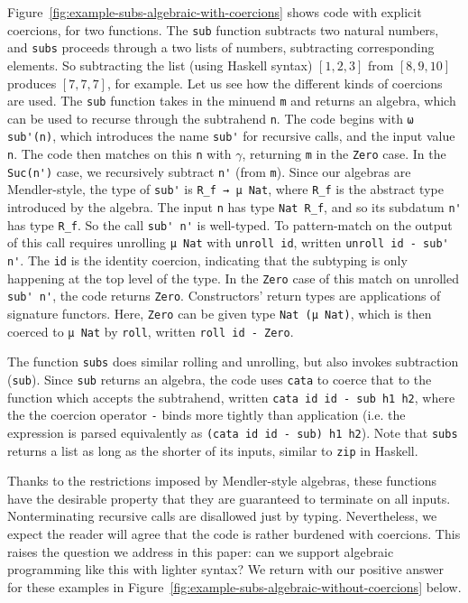 \documentclass[runningheads]{llncs}
\begin{document}
Figure~\ref{fig:example-subs-algebraic-with-coercions} shows code with
explicit coercions, for two functions.  The \verb|sub| function
subtracts two natural numbers, and \verb|subs| proceeds through a two
lists of numbers, subtracting corresponding elements.  So subtracting
the list (using Haskell syntax) $[1,2,3]$ from $[8,9,10]$ produces
$[7,7,7]$, for example.  Let us see how the different kinds
of coercions are used.  The \verb|sub| function takes in the minuend \verb|m|
and returns an algebra, which can be used to recurse through the
subtrahend \verb|n|.  The code begins with \verb|ω sub'(n)|, which
introduces the name \verb|sub'| for recursive calls, and the input value
\verb|n|.  The code then matches on this \verb|n| with $\gamma$,
returning \verb|m| in the \verb|Zero| case.  In the \verb|Suc(n')|
case, we recursively subtract \verb|n'| (from \verb|m|).  Since our
algebras are Mendler-style, the type of \verb|sub'| is
\verb|R_f → μ Nat|, where \verb|R_f| is the abstract type introduced by
the algebra.  The input \verb|n| has type \verb|Nat R_f|, and so its subdatum
\verb|n'| has type \verb|R_f|.  So the call \verb|sub' n'| is
well-typed.  To pattern-match on the output of this call requires
unrolling \verb|μ Nat| with \verb|unroll id|, written \verb|unroll id - sub' n'|.
The \verb|id| is
the identity coercion, indicating that the subtyping is only happening
at the top level of the type.  In the \verb|Zero| case of this match
on unrolled \verb|sub' n'|, the code returns \verb|Zero|.
Constructors' return types are applications of signature functors.
Here, \verb|Zero| can be given type \verb|Nat (μ Nat)|, which is then
coerced to \verb|μ Nat| by \verb|roll|, written \verb|roll id - Zero|.

The function \verb|subs| does
similar rolling and unrolling, but also invokes subtraction
(\verb|sub|).  Since \verb|sub| returns an algebra, the code uses
\verb|cata| to coerce that to the function which accepts the
subtrahend, written \verb|cata id id - sub h1 h2|, where the the coercion operator \verb|-| binds more tightly than application (i.e. the expression is parsed equivalently as \verb|(cata id id - sub) h1 h2|).
Note that \verb|subs| returns a list as long as the shorter of its inputs,
similar to \verb|zip| in Haskell.

Thanks to the restrictions imposed by Mendler-style algebras, these
functions have the desirable property that they are guaranteed to
terminate on all inputs.  Nonterminating recursive calls are
disallowed just by typing.  Nevertheless, we expect the reader will
agree that the code is rather burdened with coercions.  This raises
the question we address in this paper: can we support algebraic
programming like this with lighter syntax?  We return with our
positive answer for these examples in
Figure~\ref{fig:example-subs-algebraic-without-coercions} below.
\end{document}
